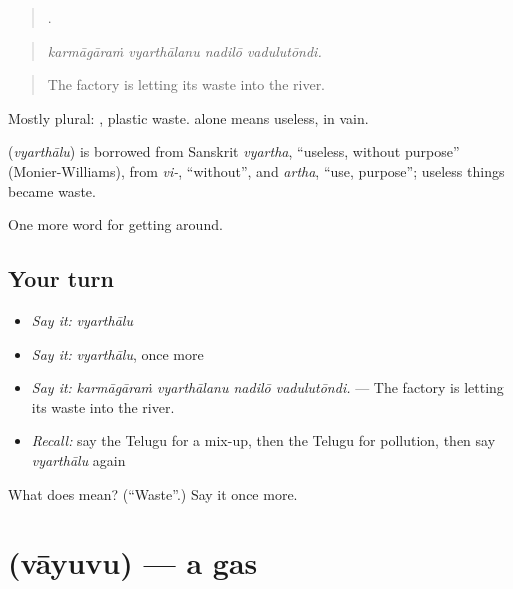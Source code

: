 \begin{quote}
   .
\end{quote}

\begin{quote}
\emph{karmāgāraṁ vyarthālanu nadilō vadulutōndi.}
\end{quote}

\begin{quote}
The factory is letting its waste into the river.
\end{quote}

Mostly plural:  , plastic waste.  alone means useless, in vain.

\begin{cousinweb}
\textbf{} (\emph{vyarthālu}) is borrowed from Sanskrit \emph{vyartha}, \textquotedblleft{}useless, without purpose\textquotedblright{} (Monier-Williams), from \emph{vi-}, \textquotedblleft{}without\textquotedblright{}, and \emph{artha}, \textquotedblleft{}use, purpose\textquotedblright{}; useless things became waste.
\end{cousinweb}

\begin{grammarlens}[title={What you've built}]
One more word for getting around.
\end{grammarlens}

\subsection*{Your turn}
\begin{itemize}
\raggedright
  \item \emph{Say it:} \emph{vyarthālu}
  \item \emph{Say it:} \emph{vyarthālu}, once more
  \item \emph{Say it:} \emph{karmāgāraṁ vyarthālanu nadilō vadulutōndi.} — The factory is letting its waste into the river.
  \item \emph{Recall:} say the Telugu for a mix-up, then the Telugu for pollution, then say \emph{vyarthālu} again
\end{itemize}

\begin{tcolorbox}[breakable,colback=teal!4,colframe=teal!35!black,title={Before you move on}]
What does  mean? (\textquotedblleft{}Waste\textquotedblright{}.) Say it once more.
\end{tcolorbox}
\section[\texorpdfstring{\te{వాయువు} (vāyuvu)}{వాయువు (vāyuvu)}]{ (vāyuvu) — a gas}


